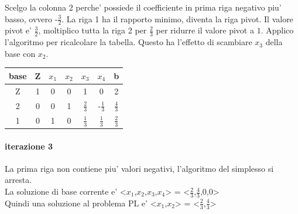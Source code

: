 \documentclass[a4paper,12pt,oneside]{article}
\begin{document}
    Scelgo la colonna 2 perche' possiede il coefficiente in prima riga negativo piu' basso, ovvero -$\frac 3 2$.
    La riga 1 ha il rapporto minimo, diventa la riga pivot.
    Il valore pivot e' $\frac 3 2$, moltiplico tutta la riga 2 per $\frac 2 3$ per ridurre il valore pivot a $1$.
    Applico l'algoritmo per ricalcolare la tabella.
    Questo ha l'effetto di scambiare $x_3$ della base con $x_2$.

    \begin{center}
        \begin{tabular}{|c|c|c|c|c|c|c|}
            \hline
            base & Z & $x_1$ & $x_2$ & $x_3$ & $x_4$ & b\\
            \hline
            Z & 1 & 0 & 0 & 1 & 0 & 2\\
            2 & 0 & 0 & 1 & $\frac 2 3$ & -$\frac 1 3$ & $\frac 4 3$\\
            1 & 0 & 1 & 0 & $\frac 1 3$ & $\frac 1 3$ & $\frac 2 3$\\
            \hline
        \end{tabular}
    \end{center}

    \paragraph{iterazione 3}

    La prima riga non contiene piu' valori negativi, l'algoritmo del simplesso si arresta. \\
    La soluzione di base corrente e' <$x_1$,$x_2$,$x_3$,$x_4$> = <$\frac 2 3$,$\frac 4 3$,0,0> \\
    Quindi una soluzione al problema PL e' <$x_1$,$x_2$> = <$\frac 2 3$,$\frac 4 3$>\*
\end{document}
